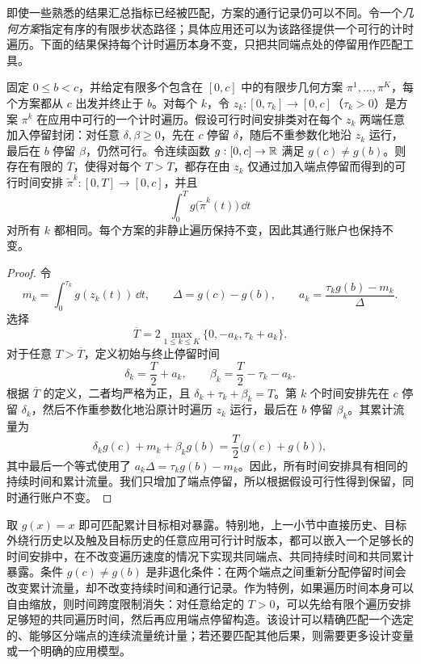 即使一些熟悉的结果汇总指标已经被匹配，方案的通行记录仍可以不同。令一个\emph{几何方案}指定有序的有限步状态路径；具体应用还可以为该路径提供一个可行的计时遍历。下面的结果保持每个计时遍历本身不变，只把共同端点处的停留用作匹配工具。

\begin{proposition}[固定遍历下的匹配方案设计]\label{prop:matched-design}
固定 $0\le b<c$，并给定有限多个包含在 $[0,c]$ 中的有限步几何方案 $\pi^1,\ldots,\pi^K$，每个方案都从 $c$ 出发并终止于 $b$。对每个 $k$，令 $z_k:[0,\tau_k]\to[0,c]$（$\tau_k>0$）是方案 $\pi^k$ 在应用中可行的一个计时遍历。假设可行时间安排类对在每个 $z_k$ 两端任意加入停留封闭：对任意 $\delta,\beta\ge0$，先在 $c$ 停留 $\delta$，随后不重参数化地沿 $z_k$ 运行，最后在 $b$ 停留 $\beta$，仍然可行。令连续函数 $g:[0,c]\to\mathbb R$ 满足 $g(c)\ne g(b)$。则存在有限的 $\overline T$，使得对每个 $T>\overline T$，都存在由 $z_k$ 仅通过加入端点停留而得到的可行时间安排 $\widetilde\pi^k:[0,T]\to[0,c]$，并且
\[
 \int_0^T g\bigl(\widetilde\pi^k(t)\bigr)\,\dd t
\]
对所有 $k$ 都相同。每个方案的非静止遍历保持不变，因此其通行账户也保持不变。
\end{proposition}

\begin{proof}
令
\[
 m_k=\int_0^{\tau_k} g(z_k(t))\,\dd t,
 \qquad
 \Delta=g(c)-g(b),
 \qquad
 a_k=\frac{\tau_k g(b)-m_k}{\Delta}.
\]
选择
\[
 \overline T
 =2\max_{1\le k\le K}\{0,-a_k,\tau_k+a_k\}.
\]
对于任意 $T>\overline T$，定义初始与终止停留时间
\[
 \delta_k=\frac{T}{2}+a_k,
 \qquad
 \beta_k=\frac{T}{2}-\tau_k-a_k.
\]
根据 $\overline T$ 的定义，二者均严格为正，且 $\delta_k+\tau_k+\beta_k=T$。第 $k$ 个时间安排先在 $c$ 停留 $\delta_k$，然后不作重参数化地沿原计时遍历 $z_k$ 运行，最后在 $b$ 停留 $\beta_k$。其累计流量为
\[
 \delta_k g(c)+m_k+\beta_k g(b)
 =\frac{T}{2}\bigl(g(c)+g(b)\bigr),
\]
其中最后一个等式使用了 $a_k\Delta=\tau_k g(b)-m_k$。因此，所有时间安排具有相同的持续时间和累计流量。我们只增加了端点停留，所以根据假设可行性得到保留，同时通行账户不变。
\end{proof}

取 $g(x)=x$ 即可匹配累计目标相对暴露。特别地，上一小节中直接历史、目标外绕行历史以及触及目标历史的任意应用可行计时版本，都可以嵌入一个足够长的时间安排中，在不改变遍历速度的情况下实现共同端点、共同持续时间和共同累计暴露。条件 $g(c)\ne g(b)$ 是非退化条件：在两个端点之间重新分配停留时间会改变累计流量，却不改变持续时间和通行记录。作为特例，如果遍历时间本身可以自由缩放，则时间跨度限制消失：对任意给定的 $T>0$，可以先给有限个遍历安排足够短的共同遍历时间，然后再应用端点停留构造。该设计可以精确匹配一个选定的、能够区分端点的连续流量统计量；若还要匹配其他后果，则需要更多设计变量或一个明确的应用模型。

